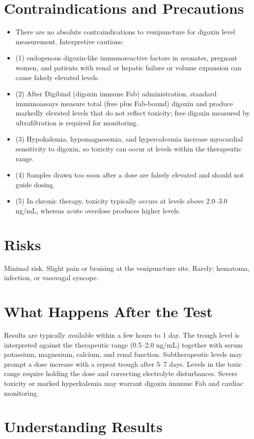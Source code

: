 \section*{Contraindications and Precautions}
\begin{itemize}
  \item There are no absolute contraindications to venipuncture for digoxin level measurement. Interpretive cautions:
  \item (1) endogenous digoxin-like immunoreactive factors in neonates, pregnant women, and patients with renal or hepatic failure or volume expansion can cause falsely elevated levels.
  \item (2) After Digibind (digoxin immune Fab) administration, standard immunoassays measure total (free plus Fab-bound) digoxin and produce markedly elevated levels that do not reflect toxicity; free digoxin measured by ultrafiltration is required for monitoring.
  \item (3) Hypokalemia, hypomagnesemia, and hypercalcemia increase myocardial sensitivity to digoxin, so toxicity can occur at levels within the therapeutic range.
  \item (4) Samples drawn too soon after a dose are falsely elevated and should not guide dosing.
  \item (5) In chronic therapy, toxicity typically occurs at levels above 2.0--3.0 ng/mL, whereas acute overdose produces higher levels.
\end{itemize}
\section*{Risks}
Minimal risk. Slight pain or bruising at the venipuncture site. Rarely: hematoma, infection, or vasovagal syncope.

\section*{What Happens After the Test}
Results are typically available within a few hours to 1 day. The trough level is interpreted against the therapeutic range (0.5--2.0 ng/mL) together with serum potassium, magnesium, calcium, and renal function. Subtherapeutic levels may prompt a dose increase with a repeat trough after 5--7 days. Levels in the toxic range require holding the dose and correcting electrolyte disturbances. Severe toxicity or marked hyperkalemia may warrant digoxin immune Fab and cardiac monitoring.

\section*{Understanding Results}

